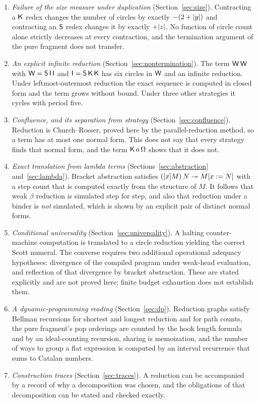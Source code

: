 \begin{enumerate}[label=(\Alph*)]
\item \emph{Failure of the size measure under duplication} (Section~\ref{sec:size}). Contracting a $\mathsf{K}$ redex changes the number of circles by exactly $-(2+\lvert y\rvert)$ and contracting an $\mathsf{S}$ redex changes it by exactly $+\lvert z\rvert$. No function of circle count alone strictly decreases at every contraction, and the termination argument of the pure fragment does not transfer.
\item \emph{An explicit infinite reduction} (Section~\ref{sec:nontermination}). The term $\mathsf{W}\,\mathsf{W}$ with $\mathsf{W}=\mathsf{S}\,\mathsf{I}\,\mathsf{I}$ and $\mathsf{I}=\mathsf{S}\,\mathsf{K}\,\mathsf{K}$ has six circles in $\mathsf{W}$ and an infinite reduction. Under leftmost-outermost reduction the exact sequence is computed in closed form and the term grows without bound. Under three other strategies it cycles with period five.
\item \emph{Confluence, and its separation from strategy} (Section~\ref{sec:confluence}). Reduction is Church--Rosser, proved here by the parallel-reduction method, so a term has at most one normal form. This does not say that every strategy finds that normal form, and the term $\mathsf{K}\,a\,\Omega$ shows that it does not.
\item \emph{Exact translation from lambda terms} (Sections~\ref{sec:abstraction} and~\ref{sec:lambda}). Bracket abstraction satisfies $([x]M)\,N\twoheadrightarrow M[x:=N]$ with a step count that is computed exactly from the structure of $M$. It follows that weak $\beta$ reduction is simulated step for step, and also that reduction under a binder is \emph{not} simulated, which is shown by an explicit pair of distinct normal forms.
\item \emph{Conditional universality} (Section~\ref{sec:universality}). A halting counter-machine computation is translated to a circle reduction yielding the correct Scott numeral. The converse requires two additional operational adequacy hypotheses: divergence of the compiled program under weak-head evaluation, and reflection of that divergence by bracket abstraction. These are stated explicitly and are not proved here; finite budget exhaustion does not establish them.
\item \emph{A dynamic-programming reading} (Section~\ref{sec:dp}). Reduction graphs satisfy Bellman recursions for shortest and longest reduction and for path counts, the pure fragment's pop orderings are counted by the hook length formula and by an ideal-counting recursion, sharing is memoization, and the number of ways to group a flat expression is computed by an interval recurrence that sums to Catalan numbers.
\item \emph{Construction traces} (Section~\ref{sec:traces}). A reduction can be accompanied by a record of why a decomposition was chosen, and the obligations of that decomposition can be stated and checked exactly.
\end{enumerate}

